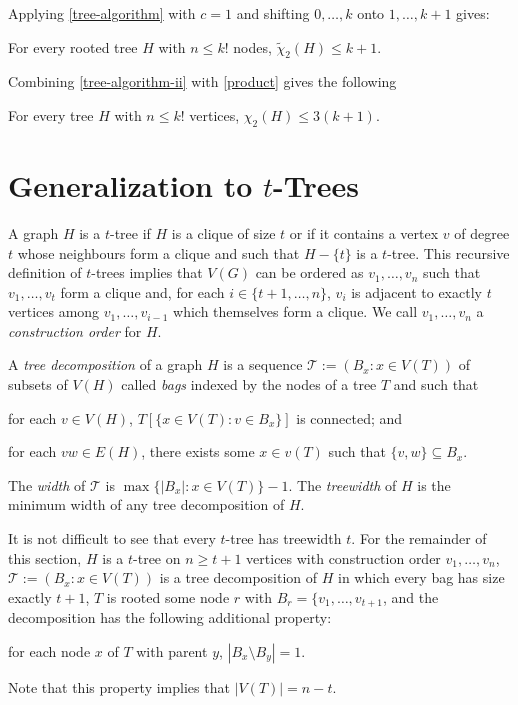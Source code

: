 \documentclass[kpfonts]{patmorin}
\newcommand{\uqs}{\chi_2}
\newcommand{\hus}{\tilde{\chi}_2}
\begin{document}
Applying \cref{tree-algorithm} with $c=1$ and shifting $0,\ldots,k$ onto $1,\ldots,k+1$ gives:

\begin{cor}\label{tree-algorithm-ii}
    For every rooted tree $H$ with $n\le k!$ nodes, $\hus(H)\le k+1$.
\end{cor}

Combining \cref{tree-algorithm-ii} with \cref{product} gives the following
\begin{thm}
    For every tree $H$ with $n\le k!$ vertices, $\uqs(H)\le 3(k+1)$.
\end{thm}


\section{Generalization to $t$-Trees}



A graph $H$ is a $t$-tree if $H$ is a clique of size $t$ or if it contains a vertex $v$ of degree $t$ whose neighbours form a clique and such that $H-\{t\}$ is a $t$-tree.  This recursive definition of $t$-trees implies that $V(G)$ can be ordered as $v_1,\ldots,v_n$ such that $v_1,\ldots,v_t$ form a clique and, for each $i\in\{t+1,\ldots,n\}$, $v_i$ is adjacent to exactly $t$ vertices among $v_1,\ldots,v_{i-1}$ which themselves form a clique.  We call $v_1,\ldots,v_n$ a \emph{construction order} for $H$.

A \emph{tree decomposition} of a graph $H$ is a sequence $\mathcal{T}:=(B_x:x\in V(T))$ of subsets of $V(H)$ called \emph{bags} indexed by the nodes of a tree $T$ and such that
\begin{inparaenum}[(i)]
    \item for each $v\in V(H)$, $T[\{x\in V(T):v\in B_x\}]$ is connected; and
    \item for each $vw\in E(H)$, there exists some $x\in v(T)$ such that $\{v,w\}\subseteq B_x$.
\end{inparaenum}
The \emph{width} of $\mathcal{T}$ is $\max\{|B_x|:x\in V(T)\}-1$. The \emph{treewidth} of $H$ is the minimum width of any tree decomposition of $H$.

It is not difficult to see that every $t$-tree has treewidth $t$.  For the remainder of this section, $H$ is a $t$-tree on $n\ge t+1$ vertices with construction order $v_1,\ldots,v_n$, $\mathcal{T}:=(B_x:x\in V(T))$ is a tree decomposition of $H$ in which every bag has size exactly $t+1$, $T$ is rooted some node $r$ with $B_r=\{v_1,\ldots,v_{t+1}$, and the decomposition has the following additional property:
\begin{inparaenum}[(i)]\setcounter{enumi}{2}
  \item for each node $x$ of $T$ with parent $y$, $|B_x\setminus B_y|=1$.
\end{inparaenum}
Note that this property implies that $|V(T)|=n-t$.
\end{document}
